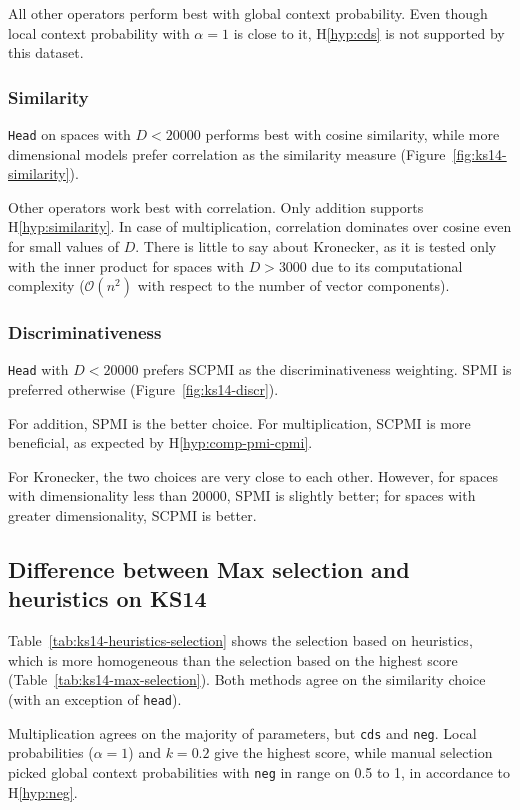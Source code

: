 All other operators perform best with global context probability. Even though local context probability with $\alpha = 1$ is close to it, H\ref{hyp:cds} is not supported by this dataset.

\subsubsection{Similarity}
\texttt{Head} on spaces with $D < 20000$ performs best with cosine similarity, while more dimensional models prefer correlation as the similarity measure (Figure~\ref{fig:ks14-similarity}).

Other operators work best with correlation. Only addition supports H\ref{hyp:similarity}. In case of multiplication, correlation dominates over cosine even for small values of $D$. There is little to say about Kronecker, as it is tested only with the inner product for spaces with $D > 3000$ due to its computational complexity ($\mathcal{O}(n^2)$ with respect to the number of vector components).

\subsubsection{Discriminativeness}


\texttt{Head} with $D < 20000$ prefers SCPMI as the discriminativeness weighting. SPMI is preferred otherwise (Figure~\ref{fig:ks14-discr}).

For addition, SPMI is the better choice. For multiplication, SCPMI is more beneficial, as expected by H\ref{hyp:comp-pmi-cpmi}.

For Kronecker, the two choices are very close to each other. However, for spaces with dimensionality less than 20000, SPMI is slightly better; for spaces with greater dimensionality, SCPMI is better.

\subsection{Difference between Max selection and heuristics on KS14}

Table~\ref{tab:ks14-heuristics-selection} shows the selection based on heuristics, which is more homogeneous than the selection based on the highest score (Table~\ref{tab:ks14-max-selection}). Both methods agree on the similarity choice (with an exception of \texttt{head}).

Multiplication agrees on the majority of parameters, but \texttt{cds} and \texttt{neg}. Local probabilities ($\alpha = 1$) and $k = 0.2$ give the highest score, while manual selection picked global context probabilities with \texttt{neg} in range on 0.5 to 1, in accordance to H\ref{hyp:neg}.

